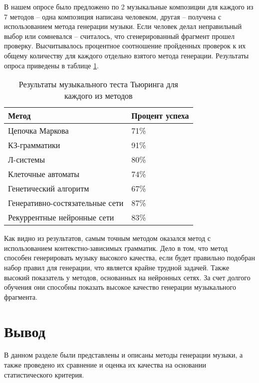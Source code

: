 В нашем опросе было предложено по 2 музыкальные композиции для каждого из 7 методов -- одна композиция написана человеком, другая -- получена с использованием метода генерации музыки. Если человек делал неправильный выбор или сомневался -- считалось, что сгенерированный фрагмент прошел проверку. Высчитывалось процентное соотношение пройденных проверок к их общему количеству для каждого отдельно взятого метода генерации. Результаты опроса приведены в таблице \ref{tbl:survey_result}. 


\begin{center}
    \captionsetup{justification=raggedright,singlelinecheck=off}
    \begin{longtable}[c]{|l|l|}
    \caption{\label{tbl:survey_result} Результаты музыкального теста Тьюринга для каждого из методов}\\ \hline
        Метод & Процент успеха \\
        \hline
        Цепочка Маркова & 71\% \\
        \hline
        КЗ-грамматики & 91\% \\
        \hline
        Л-системы & 80\% \\
        \hline
        Клеточные автоматы & 74\% \\
        \hline
        Генетический алгоритм & 67\% \\
        \hline
        Генеративно-состязательные сети & 87\% \\
        \hline
        Рекуррентные нейронные сети & 83\% \\
        \hline
    \end{longtable}
\end{center}


Как видно из результатов, самым точным методом оказался метод с использованием контекстно-зависимых грамматик. Дело в том, что метод способен генерировать музыку высокого качества, если будет правильно подобран набор правил для генерации, что является крайне трудной задачей. Также высокий показатель у методов, основанных на нейронных сетях. За счет долгого обучения они способны показать высокое качество генерации музыкального фрагмента.


\section{Вывод}

В данном разделе были представлены и описаны методы генерации музыки, а также проведено их сравнение и оценка их качества на основании статистического критерия.
